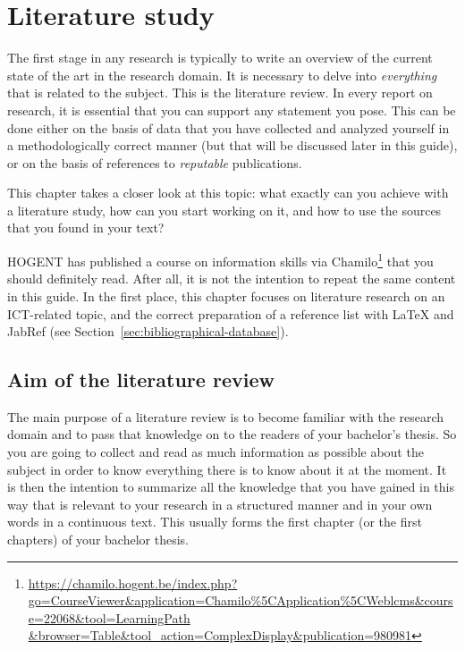 \chapter{Literature study}
\label{ch:literaturestudy}

The first stage in any research is typically to write an overview of the current state of the art in the research domain. It is necessary to delve into \emph{everything} that is related to the subject. This is the literature review. In every report on research, it is essential that you can support any statement you pose. This can be done either on the basis of data that you have collected and analyzed yourself in a methodologically correct manner (but that will be discussed later in this guide), or on the basis of references to \emph{reputable} publications.

This chapter takes a closer look at this topic: what exactly can you achieve with a literature study, how can you start working on it, and how to use the sources that you found in your text?

HOGENT has published a course on information skills via Chamilo\footnote{\url{https://chamilo.hogent.be/index.php?go=CourseViewer\&application=Chamilo\%5CApplication\%5CWeblcms\&course=22068\&tool=LearningPath \&browser=Table\&tool_action=ComplexDisplay\&publication=980981}} that you should definitely read. After all, it is not the intention to repeat the same content in this guide. In the first place, this chapter focuses on literature research on an ICT-related topic, and the correct preparation of a reference list with {\LaTeX} and JabRef (see Section~\ref{sec:bibliographical-database}).

\section{Aim of the literature review}
\label{sec:aimliteraturereview}

The main purpose of a literature review is to become familiar with the research domain and to pass that knowledge on to the readers of your bachelor's thesis. So you are going to collect and read as much information as possible about the subject in order to know everything there is to know about it at the moment. It is then the intention to summarize all the knowledge that you have gained in this way that is relevant to your research in a structured manner and in your own words in a continuous text. This usually forms the first chapter (or the first chapters) of your bachelor thesis.


